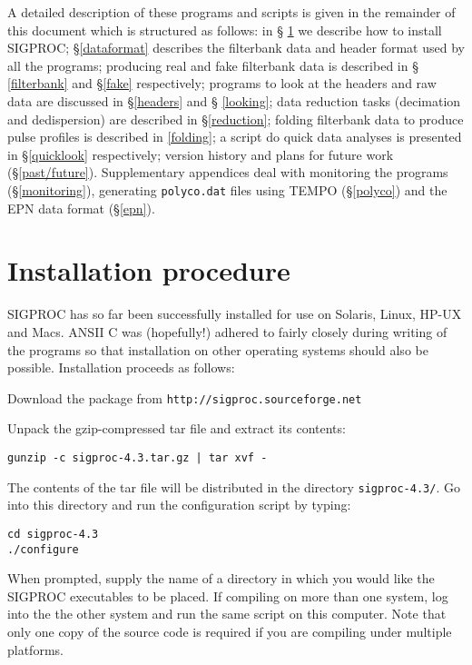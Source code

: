 \documentclass[11pt]{article}
\begin{document}
A detailed description of these programs and scripts is given in the
remainder of this document which is structured as follows: in \S
\ref{install} we describe how to install SIGPROC; \S \ref{dataformat}
describes the filterbank data and header format used by all the
programs; producing real and fake filterbank data is described in \S
\ref{filterbank} and \S \ref{fake} respectively; programs to look at
the headers and raw data are discussed in \S \ref{headers} and \S
\ref{looking}; data reduction tasks (decimation and dedispersion) are
described in \S \ref{reduction}; folding filterbank data to produce
pulse profiles is described in \ref{folding}; a script do quick data
analyses is presented in \S \ref{quicklook} respectively; version
history and plans for future work (\S \ref{past/future}). 
Supplementary appendices deal with
monitoring the programs (\S \ref{monitoring}), 
generating {\tt polyco.dat} files using {\sc TEMPO}
(\S \ref{polyco}) and the EPN data format (\S \ref{epn}).

\section{Installation procedure}
\label{install}
SIGPROC has so far been successfully installed for use on Solaris,
Linux, HP-UX and Macs.
ANSII C was (hopefully!)  adhered to fairly closely
during writing of the programs so that installation on other operating
systems should also be possible.  Installation proceeds as follows:

Download the package from 
\verb+http://sigproc.sourceforge.net+

Unpack the gzip-compressed tar file and extract its contents:

\noindent 
{\tt gunzip -c sigproc-4.3.tar.gz | tar xvf -}

The contents of the tar file will be distributed in the directory
{\tt sigproc-4.3/}. Go into this directory and run the configuration
script by typing: 

\noindent
{\tt cd sigproc-4.3}\\
{\tt ./configure}

\noindent
When prompted, supply the name
of a directory in which you would like the SIGPROC executables to
be placed.
If compiling on more than one system, log into the the other system
and run the same script on this computer.
Note that only one copy of the source code is required
if you are compiling under multiple platforms.
\end{document}

